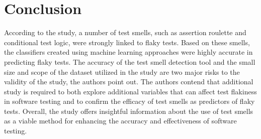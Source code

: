 \documentclass[sigconf,review]{acmart}
\begin{document}
 \section{Conclusion}
 \label{Section:Conclusion}
According to the study, a number of test smells, such as assertion roulette and conditional test logic, were strongly linked to flaky tests. Based on these smells, the classifiers created using machine learning approaches were highly accurate in predicting flaky tests.
The accuracy of the test smell detection tool and the small size and scope of the dataset utilized in the study are two major risks to the validity of the study, the authors point out. The authors contend that additional study is required to both explore additional variables that can affect test flakiness in software testing and to confirm the efficacy of test smells as predictors of flaky tests.
Overall, the study offers insightful information about the use of test smells as a viable method for enhancing the accuracy and effectiveness of software testing.
 
 
 




\end{document}
